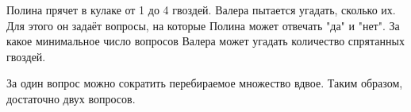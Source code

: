 
Полина прячет в кулаке от 1 до 4 гвоздей. Валера пытается угадать, сколько их. Для этого он задаёт вопросы, на которые Полина может отвечать "да" и "нет". За какое минимальное число вопросов Валера может угадать количество спрятанных гвоздей.

\solutionSection

За один вопрос можно сократить перебираемое множество вдвое. Таким образом, достаточно двух вопросов.

